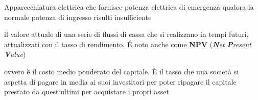 \begin{acronym}
\begin{multicols}{2}
		   {\newline \small Apparecchiatura elettrica che fornisce potenza elettrica di emergenza qualora la normale potenza di ingresso risulti insufficiente\par}
		   
		   {\newline \small il valore attuale di una serie di flussi di cassa che si realizzano in tempi futuri, attualizzati con il tasso di rendimento. \'E noto anche come \textbf{NPV} (\textit{\textbf{N}et \textbf{P}resent \textbf{V}alue}) \par}		   

		   {\newline \small ovvero è il costo medio ponderato del capitale. \`E il tasso che una società si aspetta di pagare in media ai suoi investitori per poter ripagare il capitale prestato da quest`ultimi per acquistare i propri asset \par}		
		   
\end{multicols}
\end{acronym}